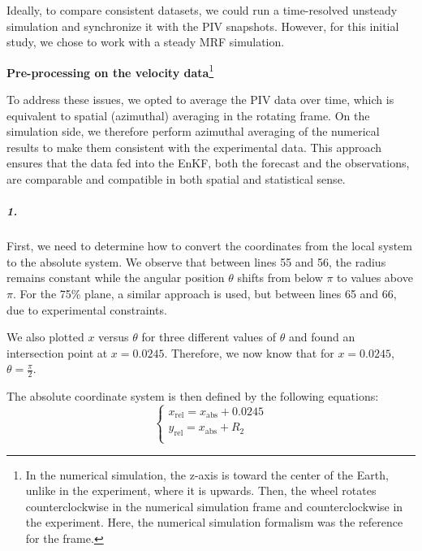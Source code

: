 Ideally, to compare consistent datasets, we could run a time-resolved unsteady simulation and synchronize it with the PIV snapshots. However, for this initial study, we chose to work with a steady MRF simulation.

\textbf{Pre-processing on the velocity data}\footnote{
In the numerical simulation, the z-axis is toward the center of the Earth, unlike in the experiment, where it is upwards.
Then, the wheel rotates counterclockwise in the numerical simulation frame and counterclockwise in the experiment.
Here, the numerical simulation formalism was the reference for the frame.
}

To address these issues, we opted to average the PIV data over time, which is equivalent to spatial (azimuthal) averaging in the rotating frame. On the simulation side, we therefore perform azimuthal averaging of the numerical results to make them consistent with the experimental data.
This approach ensures that the data fed into the EnKF, both the forecast and the observations, are comparable and compatible in both spatial and statistical sense.

\subparagraph{1.}

First, we need to determine how to convert the coordinates from the local system to the absolute system.
We observe that between lines 55 and 56, the radius remains constant while the angular position \(\theta\) shifts from below \(\pi\) to values above \(\pi\). 
For the 75\% plane, a similar approach is used, but between lines 65 and 66, due to experimental constraints.

We also plotted \(x\) versus \(\theta\) for three different values of \(\theta\) and found an intersection point at \(x = 0.0245\).
Therefore, we now know that for \(x = 0.0245\), \(\theta = \frac{\pi}{2}\).

The absolute coordinate system is then defined by the following equations:
\begin{equation}
    \begin{cases}
        x_{\text{rel}} = x_{\text{abs}} + 0.0245 \\
        y_{\text{rel}} = x_{\text{abs}} + R_{2} \\
    \end{cases}
\end{equation}

